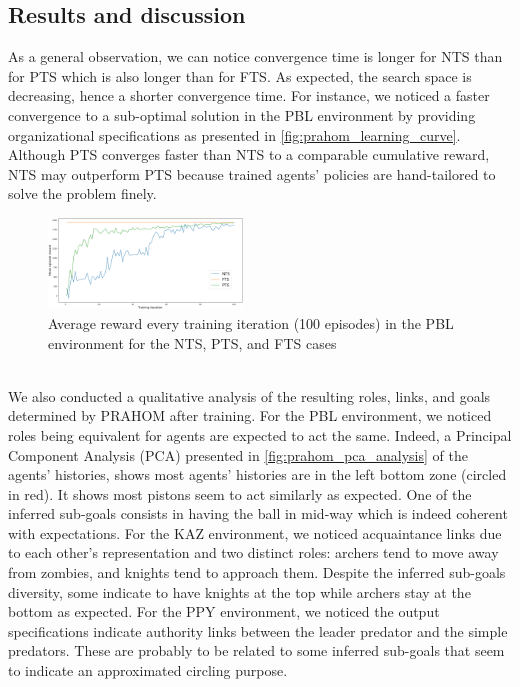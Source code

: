 \documentclass[runningheads]{llncs}
\begin{document}
\subsection{Results and discussion}




As a general observation, we can notice convergence time is longer for NTS than for PTS which is also longer than for FTS. As expected, the search space is decreasing, hence a shorter convergence time. For instance, we noticed a faster convergence to a sub-optimal solution in the PBL environment by providing organizational specifications as presented in \autoref{fig:prahom_learning_curve}. Although PTS converges faster than NTS to a comparable cumulative reward, NTS may outperform PTS because trained agents' policies are hand-tailored to solve the problem finely.
%
%
% 
%
%
%
\begin{figure}[h!]
    \centering
    \includegraphics[width=0.46\textwidth]{figures/prahom_learning_curve.png}
    \caption{Average reward every training iteration (100 episodes) in the PBL environment for the NTS, PTS, and FTS cases\\ \phantom{X} \\}
    \label{fig:prahom_learning_curve}
\end{figure}

We also conducted a qualitative analysis of the resulting roles, links, and goals determined by PRAHOM after training.
%
For the PBL environment, we noticed roles being equivalent for agents are expected to act the same. Indeed, a Principal Component Analysis (PCA) presented in \autoref{fig:prahom_pca_analysis} of the agents' histories, shows most agents’ histories are in the left bottom zone (circled in red). It shows most pistons seem to act similarly as expected. One of the inferred sub-goals consists in having the ball in mid-way which is indeed coherent with expectations.
%
For the KAZ environment, we noticed acquaintance links due to each other's representation and two distinct roles: archers tend to move away from zombies, and knights tend to approach them. Despite the inferred sub-goals diversity, some indicate to have knights at the top while archers stay at the bottom as expected.
%
For the PPY environment, we noticed the output specifications indicate authority links between the leader predator and the simple predators. These are probably to be related to some inferred sub-goals that seem to indicate an approximated circling purpose.
\end{document}
